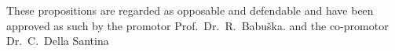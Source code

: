 \documentclass{propositions}
\begin{document}
\begin{center}
These propositions are regarded as opposable and defendable and have been approved as such by the
promotor Prof.\ Dr.\ R.\ Babu\v{s}ka.
and the co-promotor Dr.\ C.\ Della Santina
\end{center}




















\end{document}
